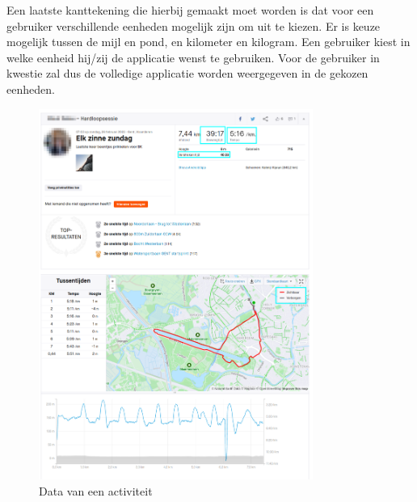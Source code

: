 Een laatste kanttekening die hierbij gemaakt moet worden is dat voor een
gebruiker verschillende eenheden mogelijk zijn om uit te kiezen. Er is keuze
mogelijk tussen de mijl en pond, en kilometer en kilogram. Een gebruiker kiest
in welke eenheid hij/zij de applicatie wenst te gebruiken. Voor de gebruiker in
kwestie zal dus de volledige applicatie worden weergegeven in de gekozen
eenheden.
\begin{figure}
    \centering
    \includegraphics[width=0.8\textwidth]{fig/VoorbeeldActiviteit_Personal.png}
    \caption{Data van een activiteit}\label{fig:activityData}
\end{figure}


